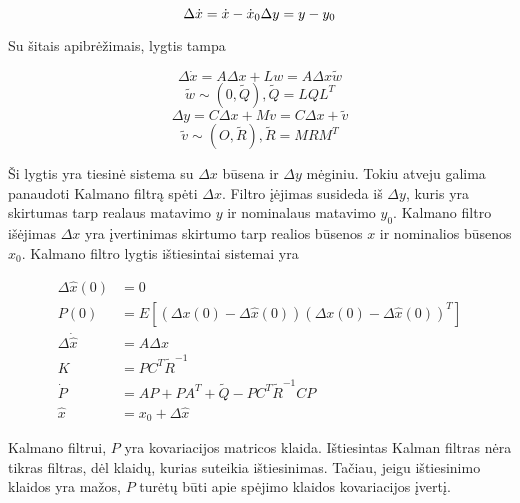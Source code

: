     \begin{equation}
        \Delta \dot{x} = \dot{x} - \dot{x}_0 \\
        \Delta y = y - y_0
    \end{equation}

    Su šitais apibrėžimais, lygtis tampa

    \begin{equation}
        \Delta \dot{x} = A \Delta x + Lw = A \Delta x \tilde{w}
    \end{equation}
    \begin{equation}
        \tilde{w} \sim (0, \tilde{Q}), \tilde{Q} = LQL^T
    \end{equation}
    \begin{equation}
        \Delta y = C \Delta x + Mv = C \Delta x + \tilde{v}
    \end{equation}
    \begin{equation}
        \tilde{v} \sim (O, \tilde{R}), \tilde{R} = MRM^T
    \end{equation}

    Ši lygtis yra tiesinė sistema su $\Delta x$ būsena ir $\Delta y$ mėginiu.
    Tokiu atveju galima panaudoti Kalmano filtrą spėti $\Delta x$.
    Filtro įėjimas susideda iš $\Delta y$, kuris yra skirtumas tarp realaus matavimo $y$ ir nominalaus matavimo $y_0$.
    Kalmano filtro išėjimas $\Delta x$ yra įvertinimas skirtumo tarp realios būsenos $x$ ir nominalios būsenos $x_0$.
    Kalmano filtro lygtis ištiesintai sistemai yra

    \begin{equation}
        \label{eq:linerialized_kalman_filter}
        \begin{aligned}
            \Delta \hat{x} (0) &= 0\\
            P(0) &= E[(\Delta x(0) - \Delta \hat{x}(0))(\Delta{x}(0) - \Delta \hat{x}(0))^T]\\
            \Delta \dot{\hat{x}} &= A \Delta \hat{x} \\
            K &= PC^T\tilde{R}^{-1}\\
            \dot{P} &= AP + PA^T + \tilde{Q} - PC^T\tilde{R}^{-1}CP\\
            \hat{x} &= x_0 + \Delta \hat{x}
        \end{aligned}
    \end{equation}

    Kalmano filtrui, $P$ yra kovariacijos matricos klaida.
    Ištiesintas Kalman filtras nėra tikras filtras, dėl klaidų, kurias suteikia ištiesinimas.
    Tačiau, jeigu ištiesinimo klaidos yra mažos, $P$ turėtų būti apie spėjimo klaidos kovariacijos įvertį.



